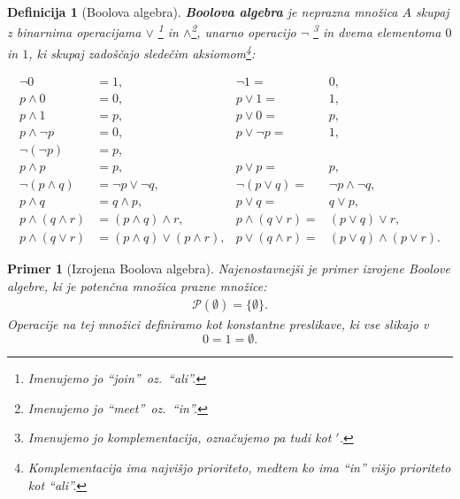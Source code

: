 \documentclass{amsart}
\newtheorem{definicija}[izrek]{Definicija}
\newtheorem{primer}[izrek]{Primer}
\begin{document}
\begin{definicija}[Boolova algebra]
    {\bf Boolova algebra} je neprazna množica \(A\) skupaj z binarnima operacijama \(\vee\) \footnote{Imenujemo jo ``join''\ oz.\ 
    ``ali''.} in \(\wedge\)\footnote{Imenujemo jo ``meet''\ oz.\ ``in''.}, unarno operacijo \(\neg\)
    \footnote{Imenujemo jo komplementacija, označujemo pa tudi kot \('\).} in dvema  
    elementoma \(0\) in \(1\), ki skupaj zadoščajo sledečim aksiomom\footnote{Komplementacija ima najvišjo prioriteto, medtem ko ima ``in'' višjo prioriteto kot ``ali''.}:

    \begin{align}
        \label{eq0}
        \neg 0 &= 1, & \neg 1 =& 0,\\ \label{eq1}
        p \wedge 0 &= 0, & p \vee 1 =& 1,\\ \label{eq2}
        p \wedge 1 &= p, & p \vee 0 =& p,\\ \label{eq3}
        p \wedge \neg p &= 0, & p \vee \neg p =& 1,\\ \label{eq4}
         \neg (\neg p) &= p,\\ \label{eq5}
        p \wedge p &= p, & p \vee p =& p,\\ \label{eq6}
        \neg (p \wedge q) &= \neg p \vee \neg q, & \neg (p \vee q) =& \neg p \wedge \neg q,\\ \label{eq7}
        p \wedge q &= q \wedge p, & p \vee q =& q \vee p,\\ \label{eq8}
        p \wedge (q \wedge r) &= (p \wedge q) \wedge r, & p \wedge (q \vee r) =& (p \vee q) \vee r,\\ \label{eq9}
        p \wedge (q \vee r) &= (p \wedge q) \vee (p \wedge r), & p \vee (q \wedge r) =& (p \vee q) \wedge (p \vee r).
    \end{align}
    
\end{definicija}

\begin{primer}[Izrojena Boolova algebra]
    Najenostavnejši je primer izrojene Boolove algebre, ki je potenčna množica prazne množice:
    \begin{align*}
        \mathcal{P}\left(\emptyset\right) = \{\emptyset\}.
    \end{align*}
    Operacije na tej množici definiramo kot konstantne preslikave, ki vse slikajo v \[0 = 1 = \emptyset.\]
\end{primer}
\end{document}
